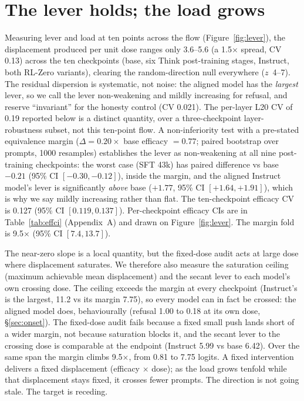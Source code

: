 \documentclass[11pt]{article}
\newcommand{\x}{$\times$}
\begin{document}
\section{The lever holds; the load grows}\label{sec:lever}
Measuring lever and load at ten points across the flow (Figure~\ref{fig:lever}), the displacement
produced per unit dose ranges only \num{3.6}--\num{5.6} (a \num{1.5}\x{} spread, CV \num{0.13}) across the
ten checkpoints (base, six Think post-training stages, Instruct, both RL-Zero variants), clearing the
random-direction null everywhere ($z$~4--7). The residual dispersion is systematic, not noise: the
aligned model has the \emph{largest} lever, so we call the lever non-weakening and mildly increasing
for refusal, and reserve ``invariant'' for the honesty control (CV \num{0.021}). The per-layer L20 CV
of \num{0.19} reported below is a distinct quantity, over a three-checkpoint layer-robustness subset,
not this ten-point flow.
A non-inferiority test with a pre-stated equivalence margin ($\Delta = 0.20\times$ base efficacy $= 0.77$;
paired bootstrap over prompts, 1000 resamples) establishes the lever as non-weakening at all nine
post-training checkpoints: the worst case (SFT 43k) has paired difference vs base $-0.21$
(95\% CI $[-0.30, -0.12]$), inside the margin, and the aligned Instruct model's lever is significantly
\emph{above} base ($+1.77$, 95\% CI $[+1.64, +1.91]$), which is why we say mildly increasing rather than
flat. The ten-checkpoint efficacy CV is \num{0.127} (95\% CI $[0.119, 0.137]$). Per-checkpoint efficacy
CIs are in Table~\ref{tab:effci} (Appendix~A) and drawn on Figure~\ref{fig:lever}. The margin fold is \num{9.5}\x{} (95\% CI $[7.4, 13.7]$).

The near-zero slope is a local quantity, but the fixed-dose audit acts at large dose where displacement saturates. We therefore also measure the saturation ceiling (maximum achievable mean displacement) and the secant lever to each model's own crossing dose. The ceiling exceeds the margin at every checkpoint (Instruct's is the largest, \num{11.2} vs its margin \num{7.75}), so every model can in fact be crossed: the aligned model does, behaviourally (refusal \num{1.00} to \num{0.18} at its own dose, \S\ref{sec:onset}). The fixed-dose audit fails because a fixed small push lands short of a wider margin, not because saturation blocks it, and the secant lever to the crossing dose is comparable at the endpoint (Instruct \num{5.99} vs base \num{6.42}). Over the same span the margin climbs \num{9.5}\x, from \num{0.81} to
\num{7.75} logits. A fixed intervention delivers a fixed displacement (efficacy $\times$ dose); as
the load grows tenfold while that displacement stays fixed, it crosses fewer prompts. The direction
is not going stale. The target is receding.
\end{document}
